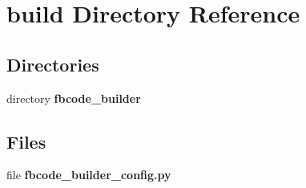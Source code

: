 \section{build Directory Reference}
\label{dir_4fef79e7177ba769987a8da36c892c5f}
\subsection*{Directories}
\begin{DoxyCompactItemize}
\item 
directory {\bf fbcode\+\_\+builder}
\end{DoxyCompactItemize}
\subsection*{Files}
\begin{DoxyCompactItemize}
\item 
file {\bf fbcode\+\_\+builder\+\_\+config.\+py}
\end{DoxyCompactItemize}
